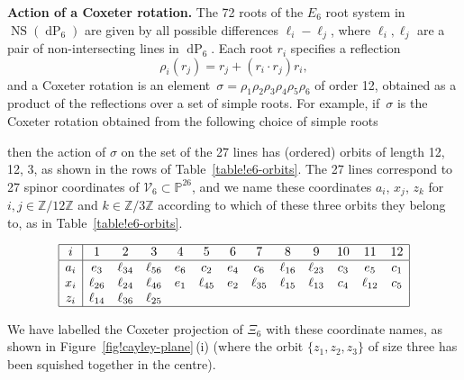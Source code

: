 \documentclass[pdftex]{sigma}
\numberwithin{equation}{section}
\theoremstyle{definition}
\newcommand{\PP}{\mathbb{P}}
\newcommand{\ZZ}{\mathbb{Z}}
\DeclareMathOperator{\NS}{NS}
\DeclareMathOperator{\dP}{dP}
\begin{document}
{\bf Action of a Coxeter rotation.}
The 72 roots of the $E_6$ root system in $\NS(\dP_6)$ are given by all possible differences $\ell_i-\ell_j$, where $\ell_i,\ell_j$ are a pair of non-intersecting lines in $\dP_6$. Each root $r_i$ specifies a reflection \[\rho_i(r_j) = r_j + (r_i\cdot r_j)r_i,\] and a Coxeter rotation is an element~${\sigma=\rho_1\rho_2\rho_3\rho_4\rho_5\rho_6}$ of order 12, obtained as a product of the reflections over a set of simple roots. For example, if~$\sigma$ is the Coxeter rotation obtained from the following choice of simple roots
\begin{center}
\end{center}
then the action of $\sigma$ on the set of the 27 lines has (ordered) orbits of length 12, 12, 3, as shown in the rows of Table~\ref{table!e6-orbits}. The 27 lines correspond to 27 spinor coordinates of $\mathcal V_6\subset\PP^{26}$, and we name these coordinates $a_i$, $x_j$, $z_k$ for $i,j\in\ZZ/12\ZZ$ and $k\in\ZZ/3\ZZ$ according to which of these three orbits they belong to, as in Table~\ref{table!e6-orbits}.
\begin{table}[htbp]\renewcommand{\arraystretch}{1.2}
$$\begin{array}{|c|cccccc cccccc|} \hline
i & 1 & 2 & 3 & 4 & 5 & 6 & 7 & 8 & 9 & 10 & 11 & 12 \\ \hline
a_i & e_3 & \ell_{34} & \ell_{56} & e_6 & c_2 & e_4 & c_6 & \ell_{16} & \ell_{23} & c_3 & e_5 & c_1 \\
x_i & \ell_{26} & \ell_{24} & \ell_{46} & e_1 & \ell_{45} & e_2 & \ell_{35} & \ell_{15} & \ell_{13} & c_4 & \ell_{12} & c_5 \\
z_i & \ell_{14} & \ell_{36} & \ell_{25} & & & & & & & & & \\ \hline
\end{array}$$
\caption{The frozen variables $a_i$ and cluster variables $x_i$, $z_i$ for $\mathcal A_6$.}
\label{table!e6-orbits}
\end{table}%
We have labelled the Coxeter projection of $\Xi_6$ with these coordinate names, as shown in Figure~\ref{fig!cayley-plane}\,(i) (where the orbit $\{z_1,z_2,z_3\}$ of size three has been squished together in the centre).
\end{document}

